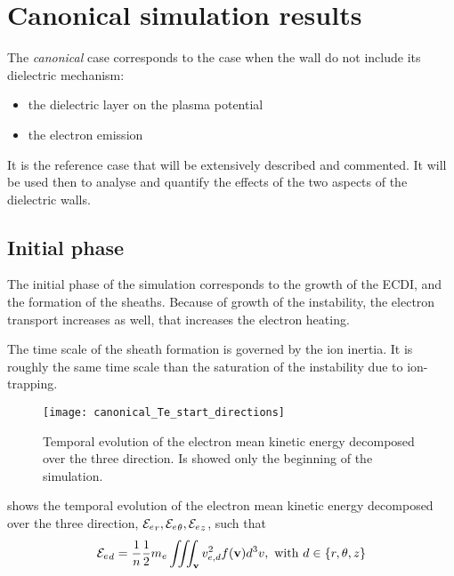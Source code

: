 
\section{Canonical simulation results}
  \label{sec-canonical}
  
  
  The {\it canonical} case corresponds to the case when the wall do not include its dielectric mechanism:
  \begin{itemize}
    \item the dielectric layer on the plasma potential
    \item the electron emission
  \end{itemize}
  It is the reference case that will be extensively described and commented.
  It will be used then to analyse and quantify the effects of the two aspects of the dielectric walls.
  
  \subsection{Initial phase} \label{subsec-initlaphase}
  The initial phase of the simulation corresponds to the growth of the \ac{ECDI}, and the formation of the sheaths.
  Because of growth of the instability, the electron transport increases as well, that increases the electron heating.
  
  The time scale of the sheath formation is governed by the ion inertia.
  It is roughly the same time scale than the saturation of the instability due to ion-trapping.
  
  \begin{figure}[hbtp]
    \centering
    \texttt{[image: canonical\_Te\_start\_directions]}
    \caption{Temporal evolution of the electron mean kinetic energy decomposed over the three direction. Is showed only the beginning of the simulation.}
    \label{fig-canon_Te_strat}
  \end{figure}
  
   shows the temporal evolution of the electron mean kinetic energy decomposed over the three direction, ${\mathcal{E}_e}_r, {\mathcal{E}_e}_{\theta}, {\mathcal{E}_e}_z$, such that
  \begin{equation} \label{eq-Ee_direction}
    {\mathcal{E}_e}_d = \frac{1}{n} \frac{1}{2} m_e \iiint_{{\mathbf v}}  v_{e,d}^2 f ({\mathbf v}) d^3v, \text{ with } d \in \{r, \theta, z  \}
  \end{equation}
  
